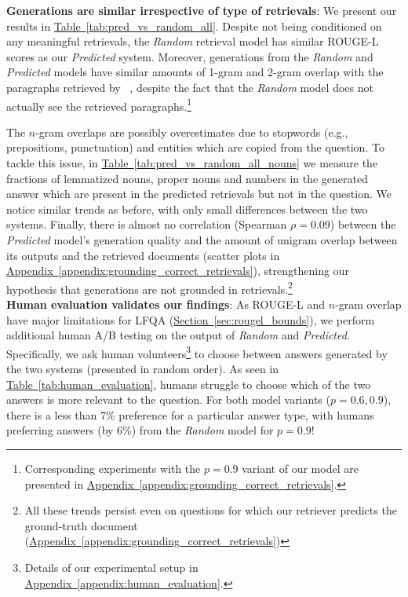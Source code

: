 \documentclass[11pt]{article}
\newcommand{\namedref}[2]{\hyperref[#2]{#1~\ref*{#2}}}
\newcommand{\sectionref}[1]{\namedref{Section}{#1}}
\newcommand{\tableref}[1]{\namedref{Table}{#1}}
\newcommand{\appendixref}[1]{\namedref{Appendix}{#1}}
\newcommand{\retriever}[1]{\textsc{c-REALM}}
\begin{document}
\noindent \textbf{Generations are similar irrespective of type of retrievals}: We present our results in \tableref{tab:pred_vs_random_all}. Despite not being conditioned on any meaningful retrievals, the \emph{Random} retrieval model has similar ROUGE-L scores as our \emph{Predicted} system. Moreover, generations from the \emph{Random} and \emph{Predicted} models have similar amounts of 1-gram and 2-gram overlap with the paragraphs retrieved by \retriever~, despite the fact that the \emph{Random} model does not actually see the retrieved paragraphs.\footnote{Corresponding experiments with the $p=0.9$ variant of our model are presented in \appendixref{appendix:grounding_correct_retrievals}.}

The $n$-gram overlaps are possibly overestimates due to stopwords (e.g., prepositions, punctuation) and entities which are copied from the question. To tackle this issue, in \tableref{tab:pred_vs_random_all_nouns} we measure the fractions of lemmatized nouns, proper nouns and numbers in the generated answer which are present in the predicted retrievals but not in the question. We notice similar trends as before, with only small differences between the two systems.
Finally, there is almost no correlation (Spearman $\rho = 0.09$) between the \emph{Predicted} model's generation quality and the amount of unigram overlap between its outputs and the retrieved documents (scatter plots in \appendixref{appendix:grounding_correct_retrievals}), strengthening our hypothesis that generations are not grounded in retrievals.\footnote{All these trends persist even on questions for which our retriever predicts the ground-truth document (\appendixref{appendix:grounding_correct_retrievals})}\\

\noindent \textbf{Human evaluation validates our findings}: As ROUGE-L and $n$-gram overlap have major limitations for LFQA (\sectionref{sec:rougel_bounds}), we perform additional human A/B testing on the output of \emph{Random} and \emph{Predicted}. Specifically, we ask human volunteers\footnote{Details of our experimental setup in \appendixref{appendix:human_evaluation}.} to choose between answers generated by the two systems (presented in random order). As seen in \tableref{tab:human_evaluation}, humans struggle to choose which of the two answers is more relevant to the question. For both model variants ($p=0.6, 0.9$), there is a less than 7\% preference for a particular answer type, with humans preferring answers (by 6\%) from the \emph{Random} model for $p=0.9$!\\
\end{document}
